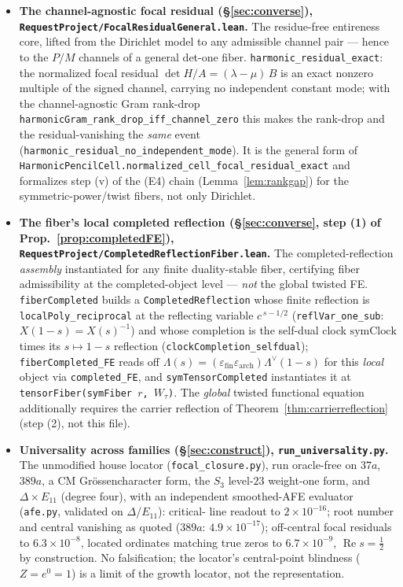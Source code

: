 \documentclass[11pt]{article}
\theoremstyle{definition}
\renewcommand{\Re}{\operatorname{Re}}
\begin{document}
\begin{itemize}
\item \textbf{The channel-agnostic focal residual (\S\ref{sec:converse}),
\texttt{RequestProject/FocalResidualGeneral.lean}.} The residue-free entireness core, lifted from the
Dirichlet model to any admissible channel pair --- hence to the $P/M$ channels of a general det-one fiber.
\texttt{harmonic\_residual\_exact}: the normalized focal residual $\det H/A=(\lambda-\mu)\,B$ is an exact
nonzero multiple of the signed channel, carrying no independent constant mode; with the channel-agnostic Gram
rank-drop \texttt{harmonicGram\_rank\_drop\_iff\_channel\_zero} this makes the rank-drop and the
residual-vanishing the \emph{same} event (\texttt{harmonic\_residual\_no\_independent\_mode}). It is the
general form of \texttt{HarmonicPencilCell.normalized\_cell\_focal\_residual\_exact} and formalizes step
\textup{(v)} of the \textup{(E4)} chain (Lemma~\ref{lem:rankgap}) for the symmetric-power/twist fibers, not
only Dirichlet. 

\item \textbf{The fiber's local completed reflection (\S\ref{sec:converse}, step (1) of
Prop.~\ref{prop:completedFE}), \texttt{RequestProject/CompletedReflectionFiber.lean}.} The completed-reflection
\emph{assembly} instantiated for any finite duality-stable fiber, certifying fiber admissibility at the
completed-object level --- \emph{not} the global twisted FE. \texttt{fiberCompleted} builds a
\texttt{CompletedReflection} whose finite reflection is \texttt{localPoly\_reciprocal} at the reflecting
variable $c^{\,s-1/2}$ (\texttt{reflVar\_one\_sub}: $X(1-s)=X(s)^{-1}$) and whose completion is the self-dual
clock $\mathrm{symClock}$ times its $s\mapsto1-s$ reflection (\texttt{clockCompletion\_selfdual});
\texttt{fiberCompleted\_FE} reads off $\Lambda(s)=(\varepsilon_{\mathrm{fin}}\varepsilon_{\mathrm{arch}})\Lambda^\vee(1-s)$
for this \emph{local} object via \texttt{completed\_FE}, and \texttt{symTensorCompleted} instantiates it at
\texttt{tensorFiber(symFiber\,$r$,\,$W_\tau$)}. The \emph{global} twisted functional equation additionally
requires the carrier reflection of Theorem~\ref{thm:carrierreflection} (step (2), not this file). 

\item \textbf{Universality across families (\S\ref{sec:construct}), \texttt{run\_universality.py}.}
The unmodified house locator (\texttt{focal\_closure.py}), run oracle-free on $37a$, $389a$, a CM
Gr\"ossencharacter form, the $S_3$ level-$23$ weight-one form, and $\Delta\times E_{11}$ (degree four),
with an independent smoothed-AFE evaluator (\texttt{afe.py}, validated on $\Delta$/$E_{11}$): critical-
line readout to $2\times10^{-16}$; root number and central vanishing as quoted
($389a$: $4.9\times10^{-17}$); off-central focal residuals to $6.3\times10^{-8}$, located ordinates
matching true zeros to $6.7\times10^{-9}$, $\Re s=\tfrac12$ by construction. No falsification; the
locator's central-point blindness ($Z=e^{0}=1$) is a limit of the growth locator, not the
representation.


\end{itemize}
\end{document}
